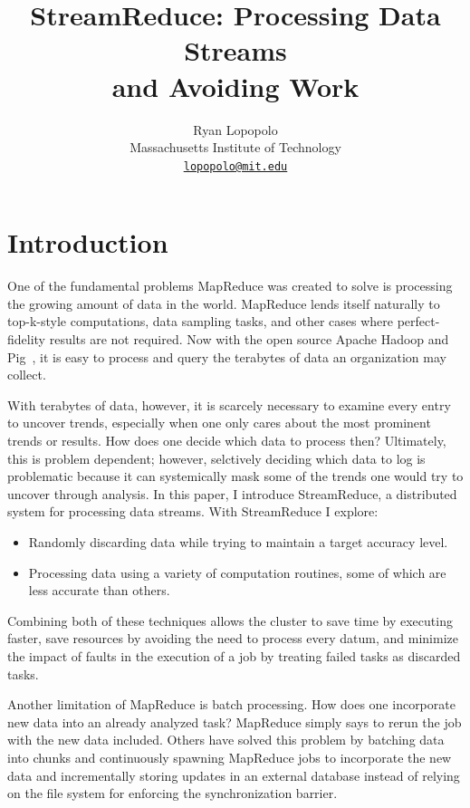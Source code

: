 \documentclass[12pt,twocolumn]{article}
\title{StreamReduce: Processing Data Streams\\and Avoiding Work}
\author{Ryan Lopopolo\\
Massachusetts Institute of Technology\\
\href{mailto:lopopolo@mit.edu}{\texttt{lopopolo@mit.edu}}}
\begin{document}
\maketitle

\section{Introduction}
\label{sec:intro}
One of the fundamental problems MapReduce was created to solve is processing
the growing amount of data in the world.
MapReduce lends itself naturally to top-k-style computations,
data sampling tasks, and other cases where perfect-fidelity results are not required.
Now with the open source Apache Hadoop
and Pig~\cite{Olston:2008:PLN:1376616.1376726}, it is easy to process and query
the terabytes of data an organization may collect.

With terabytes of data, however, it is scarcely necessary to examine
every entry to uncover trends, especially when one only cares about the most prominent
trends or results.
How does one decide which data to process then? Ultimately, this is problem dependent;
however, selctively deciding which data to
log is problematic because it can systemically mask some of the trends one would
try to uncover through analysis. In this paper, I introduce StreamReduce, a distributed system
for processing data streams. With StreamReduce I explore:
\begin{itemize}
  \item
    Randomly discarding data while trying to maintain a target accuracy level.
  \item
    Processing data using a variety of computation routines, some of which are less
    accurate than others.
\end{itemize}
Combining both of these techniques allows the cluster to save time by executing faster,
save resources by avoiding the need to process every datum, and minimize the impact of faults
in the execution of a job by treating failed tasks as discarded tasks.

Another limitation of MapReduce is batch processing. How does one
incorporate new data into an already analyzed task? MapReduce simply says to rerun
the job with the new data included. Others have solved this problem by batching data
into chunks and continuously spawning MapReduce jobs to incorporate the new data
and incrementally storing updates in an external database instead of relying on
the file system for enforcing the synchronization barrier.
\end{document}
